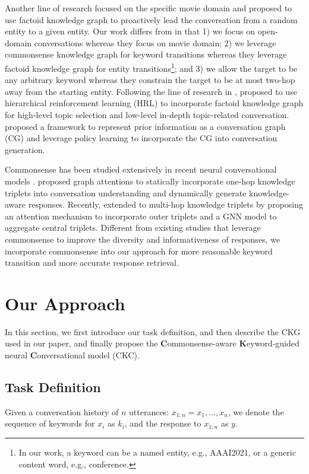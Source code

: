 \documentclass[letterpaper]{article} %
\begin{document}
Another line of research \cite{wu2019proactive} focused on the specific movie domain and proposed to use factoid knowledge graph to proactively lead the conversation from a random entity to a given entity. Our work differs from \cite{wu2019proactive} in that 1) we focus on open-domain conversations whereas they focus on movie domain; 2) we leverage commonsense knowledge graph for keyword transitions whereas they leverage factoid knowledge graph for entity transitions\footnote{In our work, a keyword can be a named entity, e.g., AAAI2021, or a generic content word, e.g., conference.}; and 3) we allow the target to be any arbitrary keyword whereas they constrain the target to be at most two-hop away from the starting entity. Following the line of research in \cite{wu2019proactive}, \citet{xu2020knowledge} proposed to use hierarchical reinforcement learning (HRL) to incorporate factoid knowledge graph for high-level topic selection and low-level in-depth topic-related conversation. \citet{xu2020conversational} proposed a framework to represent prior information as a conversation graph (CG) and leverage policy learning to incorporate the CG into conversation generation.

Commonsense has been studied extensively in recent neural conversational models \cite{young2018augmenting, zhou2018commonsense, zhang2020grounded, zhong2020care}.
\citet{zhou2018commonsense} proposed graph attentions to statically incorporate one-hop knowledge triplets into conversation understanding and dynamically generate knowledge-aware responses. Recently, \citet{zhang2020grounded} extended \cite{zhou2018commonsense} to multi-hop knowledge triplets by proposing an attention mechanism to incorporate outer triplets and a GNN model to aggregate central triplets. Different from existing studies that leverage commonsense to improve the diversity and informativeness of responses, we incorporate commonsense into our approach for more reasonable keyword transition and more accurate response retrieval.

\section{Our Approach}
\label{sec: our approach}
In this section, we first introduce our task definition, and then describe the CKG used in our paper, and finally propose the \textbf{C}ommonsense-aware \textbf{K}eyword-guided neural \textbf{C}onversational model (CKC).

\subsection{Task Definition}
\label{sec: task definition}
Given a conversation history of $n$ utterances: $x_{1:n} = x_1, ..., x_n$, we denote the sequence of keywords for $x_i$ as $k_i$, and the response to $x_{1:n}$ as $y$.
\end{document}
